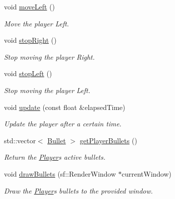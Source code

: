 \begin{DoxyCompactItemize}
\mbox{\label{class_player_ae3bbcf1159bdc059bff1c2513f2505f7}} 
void \hyperlink{class_player_ae3bbcf1159bdc059bff1c2513f2505f7}{move\+Left} ()
\begin{DoxyCompactList}\small\item\em Move the player Left. \end{DoxyCompactList}\item 
\mbox{\label{class_player_afebb6b7ca7210e7b1aa2c9ee4ff75b0e}} 
void \hyperlink{class_player_afebb6b7ca7210e7b1aa2c9ee4ff75b0e}{stop\+Right} ()
\begin{DoxyCompactList}\small\item\em Stop moving the player Right. \end{DoxyCompactList}\item 
\mbox{\label{class_player_aa150f941486096bb63cc67eabec9046c}} 
void \hyperlink{class_player_aa150f941486096bb63cc67eabec9046c}{stop\+Left} ()
\begin{DoxyCompactList}\small\item\em Stop moving the player Left. \end{DoxyCompactList}\item 
void \hyperlink{class_player_aaccee569406f6180bd5028d058b8579f}{update} (const float \&elapsed\+Time)
\begin{DoxyCompactList}\small\item\em Update the player after a certain time. \end{DoxyCompactList}\item 
\mbox{\label{class_player_a39c13745f2cd7f6c17be23965b08dfac}} 
std\+::vector$<$ \hyperlink{class_bullet}{Bullet} $>$ \hyperlink{class_player_a39c13745f2cd7f6c17be23965b08dfac}{get\+Player\+Bullets} ()
\begin{DoxyCompactList}\small\item\em Return the \hyperlink{class_player}{Player}\textquotesingle{}s active bullets. \end{DoxyCompactList}\item 
void \hyperlink{class_player_aa75798d0eaf3066acc57f6cb3158f0bb}{draw\+Bullets} (sf\+::\+Render\+Window $\ast$current\+Window)
\begin{DoxyCompactList}\small\item\em Draw the \hyperlink{class_player}{Player}\textquotesingle{}s bullets to the provided window. \end{DoxyCompactList}\item 

\end{DoxyCompactItemize}
